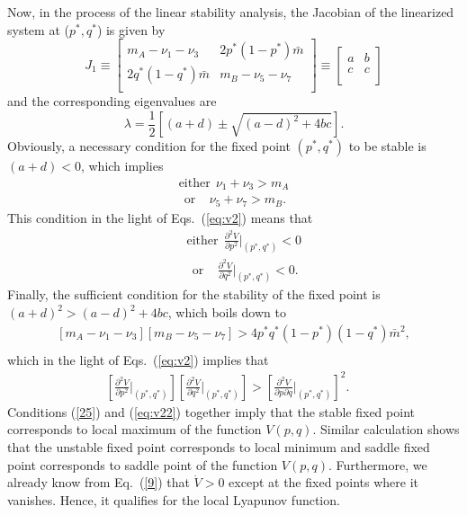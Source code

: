 \documentclass[
 pre,
 aps,
 a4paper,
 english,
 showkeys,
 reprint,
 twocolumn,
 superscriptaddress
]{revtex4}
\begin{document}
Now, in the process of the linear stability analysis, the Jacobian of the linearized system at ($p^*,q^*$) is given by
\begin{equation}\label{1}
J_1\equiv
\begin{bmatrix}
m_A-\nu_1-\nu_3       & 2p^*(1-p^*)\bar{m} \\
2q^*(1-q^*)\bar{m}      & m_B-\nu_5-\nu_7 \\
\end{bmatrix}
\equiv
\begin{bmatrix}
a       & b \\
c      & c\\
\end{bmatrix} 
\end{equation}
and the corresponding eigenvalues are
\begin{equation}
\lambda=\frac{1}{2}\left[(a+d)\pm \sqrt{(a-d)^2+4bc}\right].
\end{equation}
Obviously, a necessary condition for the fixed point $(p^*,q^*)$ to be stable is $(a+d)<0$, which implies
\begin{subequations}\label{24}
	\begin{align}
	\text{either}~~ \nu_1+\nu_3>m_A\\~~\text{or}~~~~~ \nu_5+\nu_7>m_B.
	\end{align}
\end{subequations}
This condition in the light of Eqs.~(\ref{eq:v2}) means that
\begin{subequations}\label{25}
	\begin{eqnarray}
	&& \text{either}~~ \frac{\partial^2V}{\partial p^2}\bigg|_{(p^*,q^*)}<0\\&&~~\text{or}~~~~~ \frac{\partial^2V}{\partial q^2}\bigg|_{(p^*,q^*)}<0.
	\end{eqnarray}
\end{subequations}
Finally, the sufficient condition for the stability of the fixed point is $(a+d)^2>(a-d)^2+4bc$, which boils down to
\begin{eqnarray}\label{26}
\left[m_A-\nu_1-\nu_3\right]\left[m_B-\nu_5-\nu_7\right]>4p^*q^*(1-p^*)(1-q^*)\bar{m}^2,
\nonumber\\
\end{eqnarray}
which in the light of Eqs.~(\ref{eq:v2}) implies that
\begin{eqnarray}\label{eq:v22}
\left[\frac{\partial^2V}{\partial p^2}\bigg|_{(p^*,q^*)}\right]\left[\frac{\partial^2V}{\partial q^2}\bigg|_{(p^*,q^*)}\right] >	\left[\frac{\partial^2V}{\partial p \partial q}\bigg|_{(p^*,q^*)}\right]^2.\quad
\end{eqnarray}
{\color{black}Conditions (\ref{25}) and (\ref{eq:v22})} together imply that the stable fixed point corresponds to local maximum of the function $V(p,q)$. Similar  calculation shows that the unstable fixed point corresponds to local minimum and saddle fixed point corresponds to saddle point of the function $V(p,q)$. Furthermore, we already know from Eq.~(\ref{9}) that $\dot{V}>0$ except at the fixed points where it vanishes. Hence, it qualifies for the local Lyapunov function.
\end{document}
